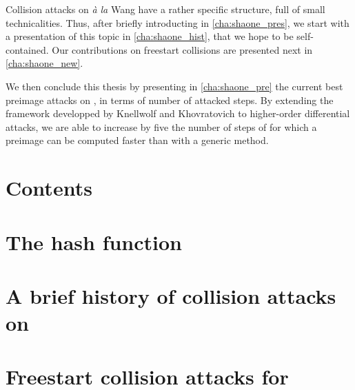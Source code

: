 Collision attacks on \shaone \emph{à la} Wang have a rather specific structure, full of small technicalities. Thus, after briefly
introducting \shaone in \autoref{cha:shaone_pres}, we start with a presentation of this topic in \autoref{cha:shaone_hist},
that we hope to be self-contained. Our contributions on freestart collisions are presented next in \autoref{cha:shaone_new}.

We then conclude this thesis by presenting in \autoref{cha:shaone_pre}
the current best preimage attacks on \shaone, in terms of number of attacked steps. By extending the framework developped by Knellwolf and Khovratovich to
higher-order differential attacks, we are able to increase by five the number of steps of \shaone for which a preimage can be computed faster than with
a generic method.



\cleardoublepage
\chapter*{Contents}
\parttoc





\chapter[Présentation de \shaone]
        {The \shaone hash function}
\label{cha:shaone_pres}






\chapter[Une brève histoire des attaques en collision sur \shaone]
        {A brief history of collision attacks on \shaone}
\label{cha:shaone_hist}



\chapter[Collisions à initialisation libres pour \shaone]
        {Freestart collision attacks for \shaone}
\label{cha:shaone_new}



